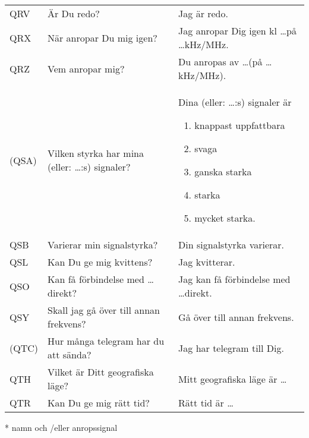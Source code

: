 \begin{table}
\begin{tabular}{lp{6cm}p{6cm}}
    \\
    QRV
    &
    Är Du redo?
    &
    Jag är redo.
    \\
    QRX
    &
    När anropar Du mig igen?
    &
    Jag anropar Dig igen kl \dots på \dots kHz/MHz.
    \\
    QRZ
    &
    Vem anropar mig?
    &
    Du anropas av \dots * (på \dots kHz/MHz).
    \\
    (QSA)
    &
    Vilken styrka har mina
    (eller: \dots *:s) signaler?
    &
    Dina (eller: \dots *:s) signaler är
    \begin{enumerate}
    \item knappast uppfattbara
    \item svaga
    \item ganska starka
    \item starka
    \item mycket starka.
    \end{enumerate}
    \\
    QSB
    &
    Varierar min signalstyrka?
    &
    Din signalstyrka varierar.
    \\
    QSL
    &
    Kan Du ge mig kvittens?
    &
    Jag kvitterar.
    \\
    QSO
    &
    Kan få förbindelse med \dots * direkt?
    &
    Jag kan få förbindelse med \dots * direkt.
    \\
    QSY
    &
    Skall jag gå över till annan frekvens?
    &
    Gå över till annan frekvens.
    \\
    (QTC)
    &
    Hur många telegram har du att sända?
    &
    Jag har telegram till Dig.
    \\
    QTH
    &
    Vilket är Ditt geografiska läge?
    &
    Mitt geografiska läge är \dots
    \\
    QTR
    &
    Kan Du ge mig rätt tid?
    &
    Rätt tid är \dots
    \\
  \end{tabular}
* namn och /eller anropssignal
\end{table}
